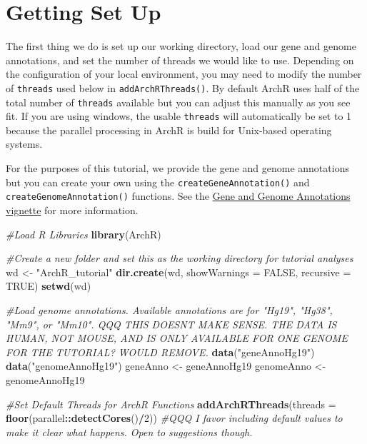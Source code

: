 \documentclass[
  12pt,
]{krantz}
\newenvironment{Shaded}{\begin{snugshade}}{\end{snugshade}}
\newcommand{\CommentTok}[1]{\textcolor[rgb]{0.56,0.35,0.01}{\textit{#1}}}
\newcommand{\DataTypeTok}[1]{\textcolor[rgb]{0.13,0.29,0.53}{#1}}
\newcommand{\DecValTok}[1]{\textcolor[rgb]{0.00,0.00,0.81}{#1}}
\newcommand{\KeywordTok}[1]{\textcolor[rgb]{0.13,0.29,0.53}{\textbf{#1}}}
\newcommand{\NormalTok}[1]{#1}
\newcommand{\OperatorTok}[1]{\textcolor[rgb]{0.81,0.36,0.00}{\textbf{#1}}}
\newcommand{\OtherTok}[1]{\textcolor[rgb]{0.56,0.35,0.01}{#1}}
\newcommand{\StringTok}[1]{\textcolor[rgb]{0.31,0.60,0.02}{#1}}
\begin{document}
\hypertarget{getting-set-up}{%
\section{Getting Set Up}\label{getting-set-up}}

The first thing we do is set up our working directory, load our gene and genome annotations, and set the number of threads we would like to use. Depending on the configuration of your local environment, you may need to modify the number of \texttt{threads} used below in \texttt{addArchRThreads()}. By default ArchR uses half of the total number of \texttt{threads} available but you can adjust this manually as you see fit. If you are using windows, the usable \texttt{threads} will automatically be set to 1 because the parallel processing in ArchR is build for Unix-based operating systems.

For the purposes of this tutorial, we provide the gene and genome annotations but you can create your own using the \texttt{createGeneAnnotation()} and \texttt{createGenomeAnnotation()} functions. See the \href{articles/Articles/annotations.html}{Gene and Genome Annotations vignette} for more information.

\begin{Shaded}
\begin{Highlighting}[]
\CommentTok{\#Load R Libraries}
\KeywordTok{library}\NormalTok{(ArchR)}

\CommentTok{\#Create a new folder and set this as the working directory for tutorial analyses}
\NormalTok{wd <{-}}\StringTok{ "ArchR\_tutorial"}
\KeywordTok{dir.create}\NormalTok{(wd, }\DataTypeTok{showWarnings =} \OtherTok{FALSE}\NormalTok{, }\DataTypeTok{recursive =} \OtherTok{TRUE}\NormalTok{)}
\KeywordTok{setwd}\NormalTok{(wd)}

\CommentTok{\#Load genome annotations. Available annotations are for "Hg19", "Hg38", "Mm9", or "Mm10". QQQ THIS DOESNT MAKE SENSE. THE DATA IS HUMAN, NOT MOUSE, AND IS ONLY AVAILABLE FOR ONE GENOME FOR THE TUTORIAL? WOULD REMOVE.}
\KeywordTok{data}\NormalTok{(}\StringTok{"geneAnnoHg19"}\NormalTok{)}
\KeywordTok{data}\NormalTok{(}\StringTok{"genomeAnnoHg19"}\NormalTok{)}
\NormalTok{geneAnno <{-}}\StringTok{ }\NormalTok{geneAnnoHg19}
\NormalTok{genomeAnno <{-}}\StringTok{ }\NormalTok{genomeAnnoHg19}

\CommentTok{\#Set Default Threads for ArchR Functions}
\KeywordTok{addArchRThreads}\NormalTok{(}\DataTypeTok{threads =} \KeywordTok{floor}\NormalTok{(parallel}\OperatorTok{::}\KeywordTok{detectCores}\NormalTok{()}\OperatorTok{/}\DecValTok{2}\NormalTok{)) }\CommentTok{\#QQQ I favor including default values to make it clear what happens. Open to suggestions though.}
\end{Highlighting}
\end{Shaded}
\end{document}
